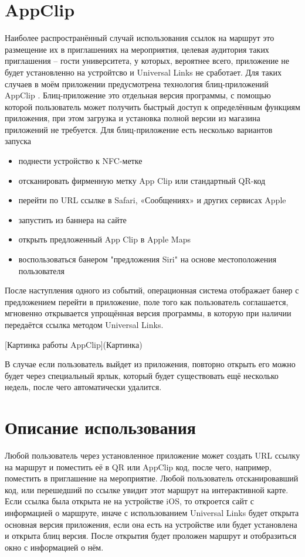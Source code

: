   \section{AppClip}
    Наиболее распространённый случай использования ссылок на маршрут это размещение их в приглашениях на мероприятия, целевая аудитория таких приглашения -- гости университета, у которых, вероятнее всего, приложение не будет установленно на устройтсво и Universal Links не сработает. Для таких случаев в моём приложении предусмотрена технология блиц-приложений AppClip \cite{AppClip}.
    Блиц-приложение это отдельная версия программы, с помощью которой пользователь может получить быстрый доступ к определённым функциям приложения, при этом загрузка и установка полной версии из магазина приложений не требуется.
    Для блиц-приложение есть несколько вариантов запуска
    \begin{itemize}
      \item поднести устройство к NFC-метке
      \item отсканировать фирменную метку App Clip или стандартный QR-код
      \item перейти по URL ссылке в Safari, «Сообщениях» и других сервисах Apple
      \item запустить из баннера на сайте
      \item открыть предложенный App Clip в Apple Maps
      \item воспользоваться банером "предложения Siri" на основе местоположения пользователя
    \end{itemize}


    После наступления одного из событий, операционная система отображает банер с предложением перейти в приложение, поле того как пользователь соглашается, мгновенно открывается упрощённая версия программы, в которую при наличии передаётся ссылка методом Universal Links.

      [Картинка работы AppClip](Картинка)

    В случае если пользователь выйдет из приложения, повторно открыть его можно будет через специальный ярлык, который будет существовать ещё несколько недель, после чего автоматически удалится.

  \section{Описание использования}
    Любой пользователь через установленное приложение может создать URL ссылку на маршрут и поместить её в QR или AppClip код, после чего, например, поместить в приглашение на мероприятие. Любой пользователь отсканировавший код, или перешедший по ссылке увидит этот маршрут на интерактивной карте.
    Если ссылка была открыта не на устройстве iOS, то откроется сайт с информацией о маршруте, иначе с использованием Universal Links будет открыта основная версия приложения, если она есть на устройстве или будет установлена и открыта блиц версия. После открытия будет проложен маршрут и отобразиться окно с информацией о нём.


